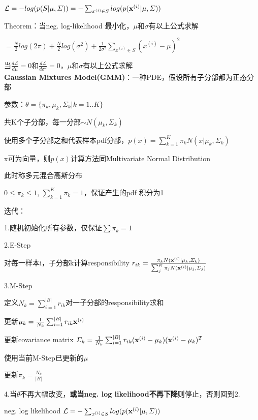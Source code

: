\documentclass[UTF8]{ctexart}
\begin{document}
  \quad \quad \quad $\mathcal{L} = -log(p(S | \mu, \varSigma)) = -\sum_{x^{(i)} \in S} log(p({\bf x}^{(i)}|\mu, \varSigma))$

  \quad \quad Theorem：当neg. log-likelihood 最小化，$\mu$和$\sigma$有以上公式求解

  \quad \quad \quad \quad $= \frac{N}{2}log(2\pi) + \frac{N}{2}log(\sigma^2) + \frac{1}{2\sigma^2}\sum_{x^{(i)} \in S}(x^{(i)} - \mu)^2$

  \quad \quad \quad 当$\frac{d\mathcal{L}}{d\mu} = 0$和$\frac{d\mathcal{L}}{d\sigma^2} = 0$，$\mu$和$\sigma$有以上公式求解\\
\textbf{Gaussian Mixtures Model(GMM)}：一种PDE，假设所有子分部都为正态分部

  参数：$\theta = \{ \pi_k, \mu_k, \varSigma_k | k = 1..K\}$
  
  \quad \quad 共K个子分部，每一分部$\sim N(\mu_k, \varSigma_k)$
  
  使用多个子分部之和代表样本pdf分部，$p(x) = \sum_{k=1}^{K} \pi_kN(x|\mu_k, \varSigma_k)$

  \quad x可为向量，则$p(x)$计算方法同Multivariate Normal Distribution

  \quad \quad 此时称多元混合高斯分布
  
  \quad $0 \leq \pi_k \leq 1$, $\sum_{k=1}^{K}\pi_k = 1$，保证产生的pdf 积分为1

  迭代：

  \quad 1.随机初始化所有参数，仅保证$\sum \pi_k = 1$

  \quad 2.E-Step 

  \quad \quad 对每一样本i，子分部k计算responsibility $r_{ik} = \frac{\pi_kN({\bf x}^{(i)} | \mu_k, \varSigma_k)}{\sum_j^K\pi_jN({\bf x}^{(i)} | \mu_j, \varSigma_j)}$

  \quad 3.M-Step

  \quad \quad 定义$N_k = \sum_{i=1}^{|B|} r_{ik}$对一子分部的responsibility求和

  \quad \quad 更新$\mu_k = \frac{1}{N_k}\sum_{i=1}^{|B|}r_{ik}{\bf x}^{(i)}$

  \quad \quad 更新covariance matrix $\varSigma_k = \frac{1}{N_k}\sum_{i=1}^{|B|}r_{ik}({\bf x}^{(i)} - \mu_k)({\bf x}^{(i)} - \mu_k)^T$

  \quad \quad \quad 使用当前M-Step已更新的$\mu$

  \quad \quad 更新$\pi_k = \frac{N_k}{|B|}$

  \quad 4.当$\theta$不再大幅改变，\textbf{或当neg. log likelihood不再下降}则停止，否则回到2.

  \quad \quad neg. log likelihood $\mathcal{L} = -\sum_{x^{(i)} \in S} log(p({\bf x}^{(i)}|\mu, \varSigma))$
\end{document}
